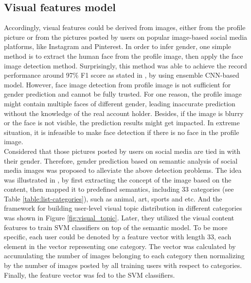 \documentclass[runningheads]{llncs}
\begin{document}
	
	\subsection{Visual features model}
	
	Accordingly, visual features could be derived from images, either from the profile picture or from the pictures posted by users on popular image-based social media platforms, like Instagram and Pinterest. In order to infer gender, one simple method is to extract the human face from the profile image, then apply the face image detection method. Surprisingly, this method was able to achieve the record performance around 97\% F1 score as stated in \cite{antipov2016minimalistic}, by using ensemble CNN-based model. However, face image detection from profile image is not sufficient for gender prediction and cannot be fully trusted. For one reason, the profile image might contain multiple faces of different gender, leading inaccurate prediction without the knowledge of the real account holder. Besides, if the image is blurry or the face is not visible, the prediction results might get impacted. In extreme situation,  it is infeasible to make face detection if there is no face in the profile image. \\

	Considered that those pictures posted by users on social media are tied in with their gender. Therefore, gender prediction based on semantic analysis of social media images was proposed to alleviate the above detection problems. The idea was illustrated in \cite{you2014eyes}, by first extracting the concept of the image based on the content, then mapped it to predefined semantics, including 33 categories (see Table \ref{table:list-categories}), such as animal, art, sports and etc. And the framework for building user-level visual topic distribution in different categories was shown in Figure \ref{fig:visual_topic}. Later, they utilized the visual content features to train SVM classifiers on top of the semantic model. To be more specific, each user could be denoted by a feature vector with length 33, each element in the vector representing one category. The vector was calculated by accumulating the number of images belonging to each category then normalizing by the number of images posted by all training users with respect to categories. Finally, the feature vector was fed to the SVM classifiers. \\
	
\end{document}
